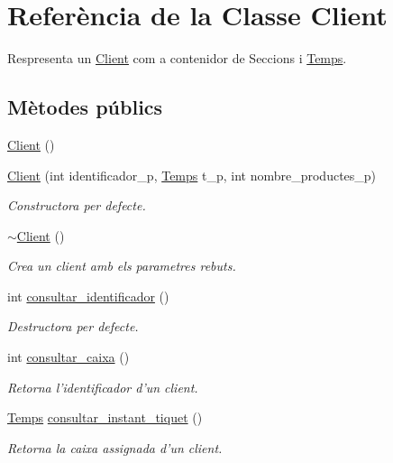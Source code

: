 \hypertarget{class_client}{\section{Referència de la Classe Client}
\label{class_client}
}


Respresenta un \hyperlink{class_client}{Client} com a contenidor de Seccions i \hyperlink{class_temps}{Temps}.  


\subsection*{Mètodes públics}
\begin{DoxyCompactItemize}
\item 
\hyperlink{class_client_ae51af7aa6b8f591496a8f6a4a87a14bf}{Client} ()
\item 
\hyperlink{class_client_a493e90fe1fed012b37d2831734fed67a}{Client} (int identificador\-\_\-p, \hyperlink{class_temps}{Temps} t\-\_\-p, int nombre\-\_\-productes\-\_\-p)
\begin{DoxyCompactList}\small\item\em Constructora per defecte. \end{DoxyCompactList}\item 
\hyperlink{class_client_a840e519ca781888cbd54181572ebe3a7}{$\sim$\-Client} ()
\begin{DoxyCompactList}\small\item\em Crea un client amb els parametres rebuts. \end{DoxyCompactList}\item 
int \hyperlink{class_client_ab9db667f1961595d18c33d81f082aba0}{consultar\-\_\-identificador} ()
\begin{DoxyCompactList}\small\item\em Destructora per defecte. \end{DoxyCompactList}\item 
int \hyperlink{class_client_ab6d7b4f334942edf741a06933f93d9ab}{consultar\-\_\-caixa} ()
\begin{DoxyCompactList}\small\item\em Retorna l'identificador d'un client. \end{DoxyCompactList}\item 
\hyperlink{class_temps}{Temps} \hyperlink{class_client_ae56fc1628dfb8b857a2cc0663b4989e8}{consultar\-\_\-instant\-\_\-tiquet} ()
\begin{DoxyCompactList}\small\item\em Retorna la caixa assignada d'un client. \end{DoxyCompactList}\item 

\end{DoxyCompactItemize}
